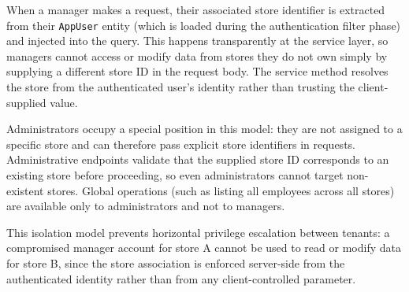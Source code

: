 \par When a manager makes a request, their associated store identifier is extracted from their \texttt{AppUser} entity (which is loaded during the authentication filter phase) and injected into the query. This happens transparently at the service layer, so managers cannot access or modify data from stores they do not own simply by supplying a different store ID in the request body. The service method resolves the store from the authenticated user's identity rather than trusting the client-supplied value.

\par Administrators occupy a special position in this model: they are not assigned to a specific store and can therefore pass explicit store identifiers in requests. Administrative endpoints validate that the supplied store ID corresponds to an existing store before proceeding, so even administrators cannot target non-existent stores. Global operations (such as listing all employees across all stores) are available only to administrators and not to managers.

\par This isolation model prevents horizontal privilege escalation between tenants: a compromised manager account for store A cannot be used to read or modify data for store B, since the store association is enforced server-side from the authenticated identity rather than from any client-controlled parameter.

